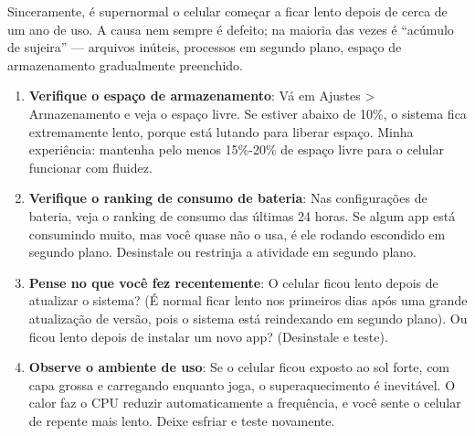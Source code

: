 


Sinceramente, é supernormal o celular começar a ficar lento depois de cerca de um ano de uso. A causa nem sempre é defeito; na maioria das vezes é “acúmulo de sujeira” — arquivos inúteis, processos em segundo plano, espaço de armazenamento gradualmente preenchido.


\begin{enumerate}
  \item \textbf{Verifique o espaço de armazenamento}: Vá em Ajustes > Armazenamento e veja o espaço livre. Se estiver abaixo de 10\%, o sistema fica extremamente lento, porque está lutando para liberar espaço. Minha experiência: mantenha pelo menos 15\%-20\% de espaço livre para o celular funcionar com fluidez.
  \item \textbf{Verifique o ranking de consumo de bateria}: Nas configurações de bateria, veja o ranking de consumo das últimas 24 horas. Se algum app está consumindo muito, mas você quase não o usa, é ele rodando escondido em segundo plano. Desinstale ou restrinja a atividade em segundo plano.
  \item \textbf{Pense no que você fez recentemente}: O celular ficou lento depois de atualizar o sistema? (É normal ficar lento nos primeiros dias após uma grande atualização de versão, pois o sistema está reindexando em segundo plano). Ou ficou lento depois de instalar um novo app? (Desinstale e teste).
  \item \textbf{Observe o ambiente de uso}: Se o celular ficou exposto ao sol forte, com capa grossa e carregando enquanto joga, o superaquecimento é inevitável. O calor faz o CPU reduzir automaticamente a frequência, e você sente o celular de repente mais lento. Deixe esfriar e teste novamente.
\end{enumerate}

